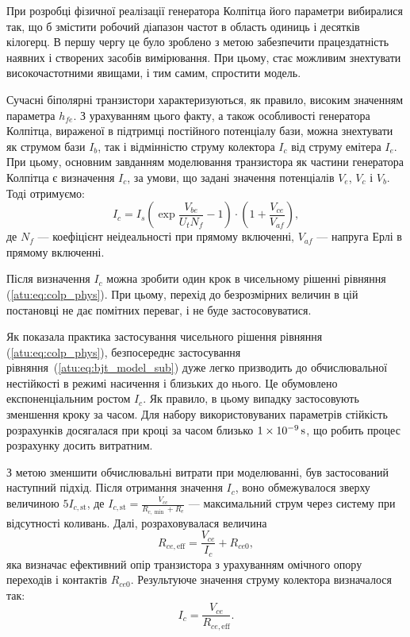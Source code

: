 При розробці фізичної реалізації генератора Колпітца його
параметри вибиралися так, що б змістити робочий діапазон
частот в область одиниць і десятків кілогерц. В першу чергу
це було зроблено з метою забезпечити працездатність наявних
і створених засобів вимірювання. При цьому, стає можливим
знехтувати високочастотними явищами, і тим самим, спростити
модель.

Сучасні біполярні транзистори характеризуються, як
правило, високим значенням параметра
$h_{fe}$. З урахуванням цього факту, а також особливості генератора
Колпітца, вираженої в підтримці постійного потенціалу бази,
можна знехтувати як струмом бази
$I_b$, так і відмінністю струму колектора
$I_c$ від струму емітера
$I_e$. При цьому, основним завданням моделювання транзистора як
частини генератора Колпітца є визначення
$I_c $, за умови, що задані значення потенціалів
$V_e $,
$V_c $ і
$V_b $. Тоді отримуємо:
%
\begin{equation}
  I_c
  = I_s \left( \exp\frac{V_{be}}{U_t N_f} - 1 \right)
    \cdot
    \left( 1 + \frac{V_{ce}}{V_{af}}\right),
  \label{atu:eq:bjt_model_sub}
\end{equation}
%
де
$N_f$ --- коефіцієнт неідеальності при прямому включенні,
$V_{af} $ --- напруга Ерлі в прямому включенні.

Після визначення
$I_c $ можна зробити один крок в чисельному рішенні рівняння
(\ref{atu:eq:colp_phys}). При цьому, перехід до безрозмірних величин в цій
постановці не дає помітних переваг, і не буде застосовуватися.

Як показала практика застосування чисельного рішення рівняння
(\ref{atu:eq:colp_phys}), безпосереднє застосування рівняння~(\ref{atu:eq:bjt_model_sub})
дуже легко призводить до обчислювальної нестійкості в режимі
насичення і близьких до нього. Це обумовлено експоненціальним ростом
$I_c $. Як правило, в цьому випадку застосовують зменшення кроку
за часом. Для набору використовуваних параметрів стійкість
розрахунків досягалася при кроці за часом близько
$\SI{1E-9}{\second} $, що робить процес розрахунку досить витратним.

З метою зменшити обчислювальні витрати при моделюванні, був
застосований наступний підхід. Після отримання значення
$I_c $, воно обмежувалося зверху величиною
$5 I_{c,\mathrm{st}}$,
де
$I_{c,\mathrm{st}} = \frac{V_{cc}}{R_{c,{\min}}+R_e}$ ---
максимальний струм через систему при відсутності коливань. Далі,
розраховувалася величина
%
\[
  R_{ce,\mathrm{eff}} = \frac{V_{ce}}{I_c} + R_{ce0},
\]
%
яка визначає ефективний опір транзистора з урахуванням омічного
опору переходів і контактів
$R_{ce0}$. Результуюче значення струму колектора визначалося так:
%
\[
  I_c = \frac{V_{ce}}{R_{ce,\mathrm{eff}}}.
\]


